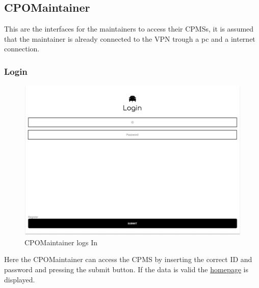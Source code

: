 \subsection{CPOMaintainer}
This are the interfaces for the maintainers to access their \acp{CPMS}, it is assumed that the maintainer is already connected to the \ac{VPN} trough a pc and a internet connection.
\subsubsection{Login}
\begin{figure}[H]
    \centering
    \includegraphics[keepaspectratio, width=15cm]{Mockup/CPMSSiteInterface/Login.png}
    \caption{\ac{CPO}Maintainer logs In}
    \label{cpo:Login}
\end{figure}
Here the \ac{CPO}Maintainer can access the \ac{CPMS} by inserting the correct ID and password and pressing the submit button. If the data is valid the \hyperref[cpo:Homepage]{homepage} is displayed.
